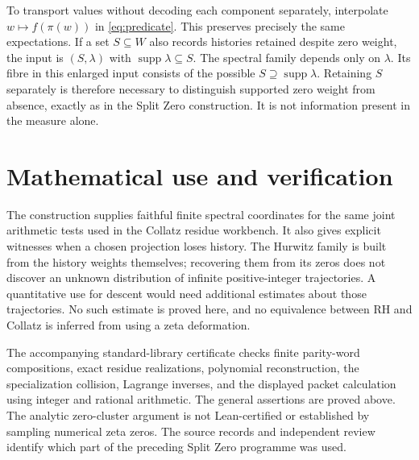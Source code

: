 \documentclass[11pt]{amsart}
\theoremstyle{remark}\newtheorem{remark}[theorem]{Remark}
\DeclareMathOperator{\supp}{supp}
\begin{document}
To transport values without decoding each component separately, interpolate
$w\mapsto f(\pi(w))$ in \eqref{eq:predicate}. This preserves precisely
the same expectations. If a set $S\subseteq W$ also records histories
retained despite zero weight, the input is $(S,\lambda)$ with
$\supp\lambda\subseteq S$. The spectral family depends only on
$\lambda$. Its fibre in this enlarged input consists of the possible
$S\supseteq\supp\lambda$. Retaining $S$ separately is therefore necessary
to distinguish supported zero weight from absence, exactly as in the
Split Zero construction. It is not information present in the measure alone.

\section{Mathematical use and verification}
The construction supplies faithful finite spectral coordinates for the
same joint arithmetic tests used in the Collatz residue workbench. It
also gives explicit witnesses when a chosen projection loses history.
The Hurwitz family is built from the history weights themselves; recovering
them from its zeros does not discover an unknown distribution of infinite
positive-integer trajectories. A quantitative use for descent would need
additional estimates about those trajectories. No such estimate is proved
here, and no equivalence between RH and Collatz is inferred from using a
zeta deformation.

The accompanying standard-library certificate checks finite parity-word
compositions, exact residue realizations, polynomial reconstruction,
the specialization collision, Lagrange inverses, and the displayed packet
calculation using integer and rational arithmetic. The general assertions
are proved above. The analytic zero-cluster argument is not Lean-certified
or established by sampling numerical zeta zeros. The source records and
independent review identify which part of the preceding Split Zero
programme was used.
\end{document}
